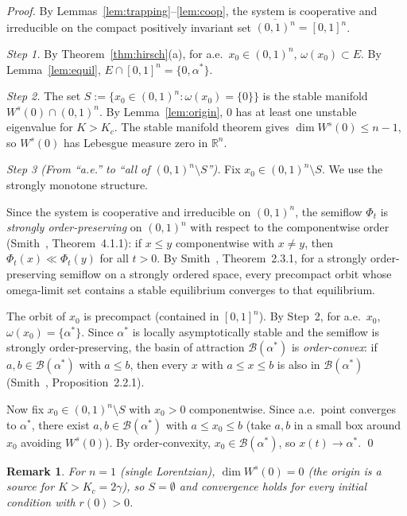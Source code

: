 \documentclass[11pt,a4paper]{article}
\newtheorem{remark}[theorem]{Remark}
\theoremstyle{definition}
\newcommand{\R}{\mathbb{R}}
\begin{document}
\begin{proof}
By Lemmas~\ref{lem:trapping}--\ref{lem:coop}, the system is cooperative and irreducible on the compact positively invariant set $\overline{(0,1)^n} = [0,1]^n$.

\emph{Step 1.} By Theorem~\ref{thm:hirsch}(a), for a.e.\ $x_0 \in (0,1)^n$, $\omega(x_0) \subset E$. By Lemma~\ref{lem:equil}, $E \cap [0,1]^n = \{0, \alpha^*\}$.

\emph{Step 2.} The set $S := \{x_0 \in (0,1)^n : \omega(x_0) = \{0\}\}$ is the stable manifold $W^s(0) \cap (0,1)^n$. By Lemma~\ref{lem:origin}, $0$ has at least one unstable eigenvalue for $K > K_c$. The stable manifold theorem gives $\dim W^s(0) \leq n - 1$, so $W^s(0)$ has Lebesgue measure zero in $\R^n$.

\emph{Step 3 (From ``a.e.'' to ``all of $(0,1)^n \setminus S$'').} Fix $x_0 \in (0,1)^n \setminus S$. We use the strongly monotone structure.

Since the system is cooperative and irreducible on $(0,1)^n$, the semiflow $\Phi_t$ is \emph{strongly order-preserving} on $(0,1)^n$ with respect to the componentwise order (Smith~\cite{smith1995}, Theorem~4.1.1): if $x \leq y$ componentwise with $x \neq y$, then $\Phi_t(x) \ll \Phi_t(y)$ for all $t > 0$. By Smith~\cite{smith1995}, Theorem~2.3.1, for a strongly order-preserving semiflow on a strongly ordered space, every precompact orbit whose omega-limit set contains a stable equilibrium converges to that equilibrium.

The orbit of $x_0$ is precompact (contained in $[0,1]^n$). By Step~2, for a.e.\ $x_0$, $\omega(x_0) = \{\alpha^*\}$. Since $\alpha^*$ is locally asymptotically stable and the semiflow is strongly order-preserving, the basin of attraction $\mathcal{B}(\alpha^*)$ is \emph{order-convex}: if $a, b \in \mathcal{B}(\alpha^*)$ with $a \leq b$, then every $x$ with $a \leq x \leq b$ is also in $\mathcal{B}(\alpha^*)$ (Smith~\cite{smith1995}, Proposition~2.2.1).

Now fix $x_0 \in (0,1)^n \setminus S$ with $x_0 > 0$ componentwise. Since a.e.\ point converges to $\alpha^*$, there exist $a, b \in \mathcal{B}(\alpha^*)$ with $a \leq x_0 \leq b$ (take $a, b$ in a small box around $x_0$ avoiding $W^s(0)$). By order-convexity, $x_0 \in \mathcal{B}(\alpha^*)$, so $x(t) \to \alpha^*$. \qed
\end{proof}

\begin{remark}
For $n = 1$ (single Lorentzian), $\dim W^s(0) = 0$ (the origin is a source for $K > K_c = 2\gamma$), so $S = \emptyset$ and convergence holds for \emph{every} initial condition with $r(0) > 0$.
\end{remark}
\end{document}
